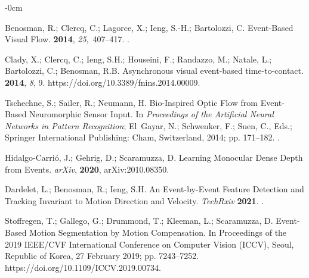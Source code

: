 \documentclass[brainsci, %
               review,accept,pdftex,moreauthors
               ]{Definitions/mdpi}
\begin{document}
\begin{adjustwidth}{-\extralength}{0cm}
\begin{thebibliography}{999}
Benosman, R.; Clercq, C.; Lagorce, X.; Ieng, {S.-H}.; Bartolozzi, C.
\newblock Event-{Based} {Visual} {Flow}.
 {\bf
  2014}, {\em 25},~407--417.
.

Clady, X.; Clercq, C.; Ieng, S.H.; Houseini, F.; Randazzo, M.; Natale, L.;
  Bartolozzi, C.; Benosman, R.B.
\newblock Asynchronous visual event-based time-to-contact.
 {\bf 2014}, {\em 8}, 9.
  {{https://doi.org/10.3389/fnins.2014.00009}}.

Tschechne, S.; Sailer, R.; Neumann, H.
\newblock Bio-{Inspired} {Optic} {Flow} from {Event}-{Based} {Neuromorphic}
  {Sensor} {Input}.
\newblock In \emph{Proceedings of the Artificial {Neural} {Networks} in {Pattern}
  {Recognition}}; El~Gayar, N.; Schwenker, F.; Suen, C., Eds.; Springer
  International Publishing: Cham, Switzerland, 2014; pp. 171--182.
.

Hidalgo-Carrió, J.; Gehrig, D.; Scaramuzza, D.
\newblock Learning {Monocular} {Dense} {Depth} from {Events}.  \emph{arXiv}, {\bf 2020}, arXiv:2010.08350.

Dardelet, L.; Benosman, R.; Ieng, S.H.
\newblock An {Event}-by-{Event} {Feature} {Detection} and {Tracking}
  {Invariant} to {Motion} {Direction} and {Velocity}. \emph{TechRxiv} {\bf 2021}.
.

Stoffregen, T.; Gallego, G.; Drummond, T.; Kleeman, L.; Scaramuzza, D.
\newblock Event-{Based} {Motion} {Segmentation} by {Motion} {Compensation}.
\newblock In Proceedings of the 2019 {IEEE}/{CVF} {International} {Conference}
  on {Computer} {Vision} ({ICCV}), {Seoul, Republic of Korea, 27 February} %
 2019; pp. 7243--7252.
 {{https://doi.org/10.1109/ICCV.2019.00734}}.


\end{thebibliography}
\end{adjustwidth}
\end{document}
